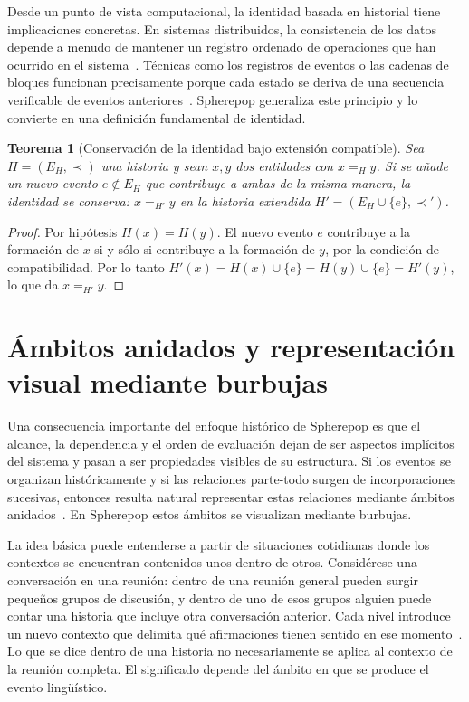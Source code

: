 \documentclass[12pt]{article}
\theoremstyle{plain}
\newtheorem{theorem}{Teorema}[section]
\theoremstyle{definition}
\begin{document}
Desde un punto de vista computacional, la identidad basada en historial tiene implicaciones concretas. En sistemas distribuidos, la consistencia de los datos depende a menudo de mantener un registro ordenado de operaciones que han ocurrido en el sistema~\cite{lamport,shapiro}. Técnicas como los registros de eventos o las cadenas de bloques funcionan precisamente porque cada estado se deriva de una secuencia verificable de eventos anteriores~\cite{kleppmann,nakamoto}. Spherepop generaliza este principio y lo convierte en una definición fundamental de identidad.

\begin{theorem}[Conservación de la identidad bajo extensión compatible]
\label{thm:conservacion}
Sea $H = (E_H, \prec)$ una historia y sean $x, y$ dos entidades con $x =_H y$. Si se añade un nuevo evento $e \notin E_H$ que contribuye a ambas de la misma manera, la identidad se conserva: $x =_{H'} y$ en la historia extendida $H' = (E_H \cup \{e\}, \prec')$.
\end{theorem}

\begin{proof}
Por hipótesis $H(x) = H(y)$. El nuevo evento $e$ contribuye a la formación de $x$ si y sólo si contribuye a la formación de $y$, por la condición de compatibilidad. Por lo tanto $H'(x) = H(x) \cup \{e\} = H(y) \cup \{e\} = H'(y)$, lo que da $x =_{H'} y$.
\end{proof}

\section{Ámbitos anidados y representación visual mediante burbujas}
\label{sec:ambitos}

Una consecuencia importante del enfoque histórico de Spherepop es que el alcance, la dependencia y el orden de evaluación dejan de ser aspectos implícitos del sistema y pasan a ser propiedades visibles de su estructura. Si los eventos se organizan históricamente y si las relaciones parte-todo surgen de incorporaciones sucesivas, entonces resulta natural representar estas relaciones mediante ámbitos anidados~\cite{church,plotkin}. En Spherepop estos ámbitos se visualizan mediante burbujas.

La idea básica puede entenderse a partir de situaciones cotidianas donde los contextos se encuentran contenidos unos dentro de otros. Considérese una conversación en una reunión: dentro de una reunión general pueden surgir pequeños grupos de discusión, y dentro de uno de esos grupos alguien puede contar una historia que incluye otra conversación anterior. Cada nivel introduce un nuevo contexto que delimita qué afirmaciones tienen sentido en ese momento~\cite{goffman,austin}. Lo que se dice dentro de una historia no necesariamente se aplica al contexto de la reunión completa. El significado depende del ámbito en que se produce el evento lingüístico.
\end{document}
